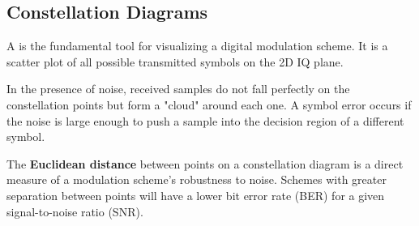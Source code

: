 \subsection{Constellation Diagrams}

A  is the fundamental tool for visualizing a digital modulation scheme. It is a scatter plot of all possible transmitted symbols on the 2D IQ plane.

\begin{center}
\end{center}

In the presence of noise, received samples do not fall perfectly on the constellation points but form a "cloud" around each one. A symbol error occurs if the noise is large enough to push a sample into the decision region of a different symbol.

\begin{keyconcept}
    The \textbf{Euclidean distance} between points on a constellation diagram is a direct measure of a modulation scheme's robustness to noise. Schemes with greater separation between points will have a lower bit error rate (BER) for a given signal-to-noise ratio (SNR).
\end{keyconcept}

